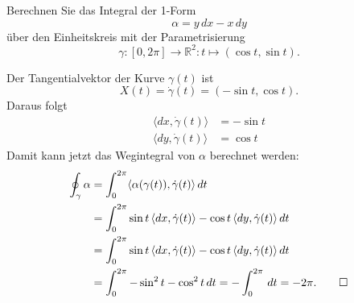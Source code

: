 Berechnen Sie das Integral der 1-Form
\[
\alpha
=
y\,dx - x \,dy
\]
über den Einheitskreis mit der Parametrisierung
\[
\gamma
\colon
[0,2\pi] \to \mathbb{R}^2
:
t\mapsto (\cos t,\sin t).
\]

\begin{loesung}
Der Tangentialvektor der Kurve $\gamma(t)$ ist
\[
X(t)
=
\dot{\gamma}(t)
=
(-\sin t,\cos t).
\]
Daraus folgt
\begin{align*}
\langle dx,\dot{\gamma}(t)\rangle
&=
-\sin t
\\
\langle dy,\dot{\gamma}(t)\rangle
&=
\cos t
\end{align*}
Damit kann jetzt das Wegintegral von $\alpha$ berechnet werden:
\begin{align*}
\oint_{\gamma} \alpha
&=
\int_0^{2\pi} \langle \alpha(\gamma(t)),\dot{\gamma}(t)\rangle \,dt
\\
&=
\int_0^{2\pi}
\sin t\,\langle dx,\dot{\gamma}(t)\rangle
-
\cos t\,\langle dy,\dot{\gamma}(t)\rangle
\,dt
\\
&=
\int_0^{2\pi}
\sin t\,\langle dx,\dot{\gamma}(t)\rangle
-
\cos t\,\langle dy,\dot{\gamma}(t)\rangle
\,dt
\\
&=
\int_0^{2\pi}
-
\sin^2 t
-
\cos^2 t
\,dt
=
-\int_0^{2\pi}\,dt
=
-2\pi.
\qedhere
\end{align*}
\end{loesung}

